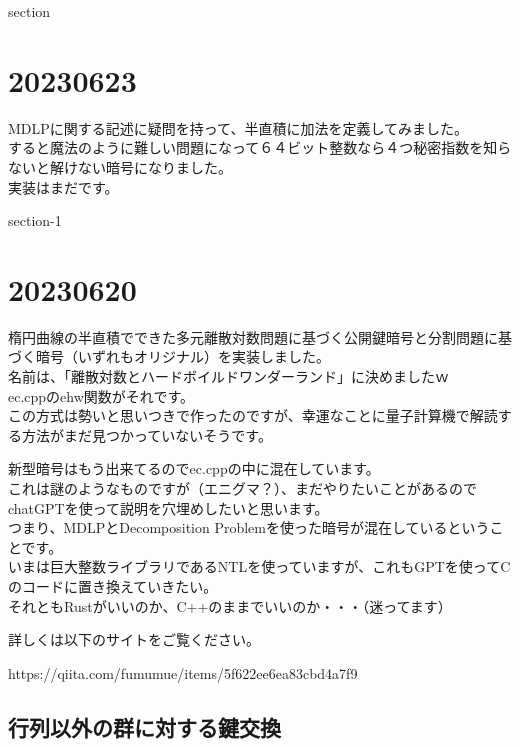 \documentclass[
]{article}
\begin{document}
section

\hypertarget{section}{%
\section{20230623}\label{section}}

MDLPに関する記述に疑問を持って、半直積に加法を定義してみました。\\
すると魔法のように難しい問題になって６４ビット整数なら４つ秘密指数を知らないと解けない暗号になりました。\\
実装はまだです。

section-1

\hypertarget{section-1}{%
\section{20230620}\label{section-1}}

楕円曲線の半直積でできた多元離散対数問題に基づく公開鍵暗号と分割問題に基づく暗号（いずれもオリジナル）を実装しました。\\
名前は、「離散対数とハードボイルドワンダーランド」に決めましたｗ\\
ec.cppのehw関数がそれです。\\
この方式は勢いと思いつきで作ったのですが、幸運なことに量子計算機で解読する方法がまだ見つかっていないそうです。

新型暗号はもう出来てるのでec.cppの中に混在しています。\\
これは謎のようなものですが（エニグマ？）、まだやりたいことがあるのでchatGPTを使って説明を穴埋めしたいと思います。\\
つまり、MDLPとDecomposition
Problemを使った暗号が混在しているということです。\\
いまは巨大整数ライブラリであるNTLを使っていますが、これもGPTを使ってCのコードに置き換えていきたい。\\
それともRustがいいのか、C++のままでいいのか・・・（迷ってます）

詳しくは以下のサイトをご覧ください。

https://qiita.com/fumumue/items/5f622ee6ea83cbd4a7f9

\hypertarget{ux884cux5217ux4ee5ux5916ux306eux7fa4ux306bux5bfeux3059ux308bux9375ux4ea4ux63db}{%
\subsection{行列以外の群に対する鍵交換}\label{ux884cux5217ux4ee5ux5916ux306eux7fa4ux306bux5bfeux3059ux308bux9375ux4ea4ux63db}}
\end{document}
